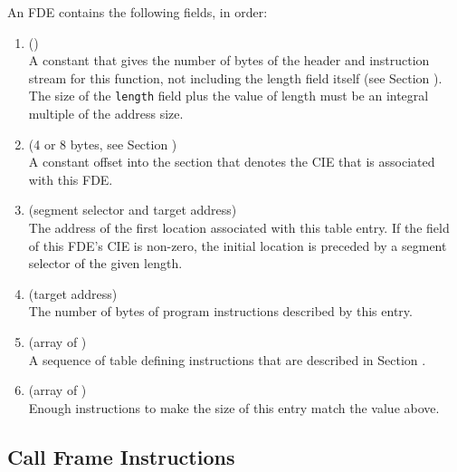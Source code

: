 An FDE contains the following fields, in order:
\begin{enumerate}[1. ]
\item \HFNlength{} ()  \\
A constant that gives the number of bytes of the header and
instruction stream for this function, not including the length
field itself 
(see Section ). 
The size of the \texttt{length} field
plus the value of length must be an integral multiple of the
address size.

\item \HFNCIEpointer{} (4 or 8 bytes, see Section ) \\
A constant 
offset into the \dotdebugframe{}
section that denotes
the CIE that is associated with this FDE.

\item  \HFNinitiallocation{} (segment selector and target address) \\
The address of the first location associated with this table
entry. 
If the \HFNsegmentselectorsize{} field of this FDE's CIE is non-zero,
the initial location is preceded by a segment selector of
the given length.

\item  \HFNaddressrange{} (target address) \\
The number 
of bytes of program instructions described by this entry.

\item \HFNinstructions{} (array of \HFTubyte) \\
A sequence of table defining instructions that are described 
in Section .

\item \HFNpadding{} (array of \HFTubyte) \\
Enough \DWCFAnop{} instructions 
to make the size of this entry match the \HFNlength{} value above.
\end{enumerate}

\subsection{Call Frame Instructions}
\label{chap:callframeinstructions}

